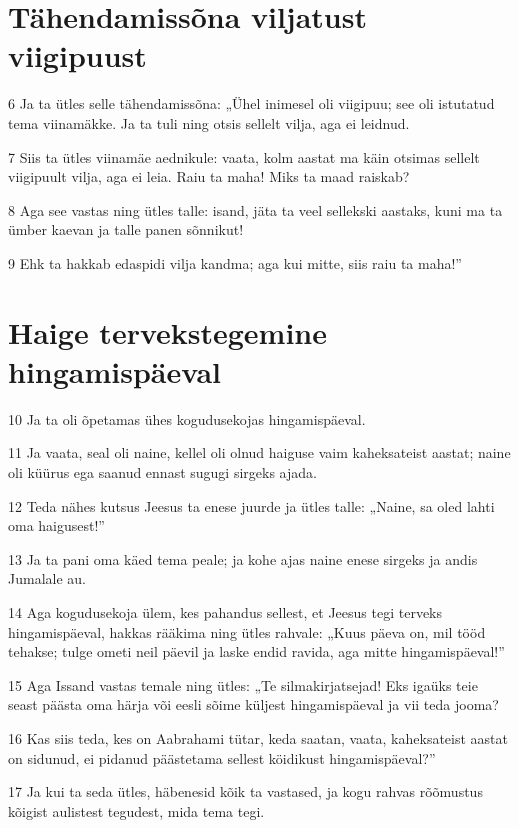 \section*{Tähendamissõna viljatust viigipuust}

\par 6 Ja ta ütles selle tähendamissõna: „Ühel inimesel oli viigipuu; see oli istutatud tema viinamäkke. Ja ta tuli ning otsis sellelt vilja, aga ei leidnud.
\par 7 Siis ta ütles viinamäe aednikule: vaata, kolm aastat ma käin otsimas sellelt viigipuult vilja, aga ei leia. Raiu ta maha! Miks ta maad raiskab?
\par 8 Aga see vastas ning ütles talle: isand, jäta ta veel sellekski aastaks, kuni ma ta ümber kaevan ja talle panen sõnnikut!
\par 9 Ehk ta hakkab edaspidi vilja kandma; aga kui mitte, siis raiu ta maha!”

\section*{Haige tervekstegemine hingamispäeval}

\par 10 Ja ta oli õpetamas ühes kogudusekojas hingamispäeval.
\par 11 Ja vaata, seal oli naine, kellel oli olnud haiguse vaim kaheksateist aastat; naine oli küürus ega saanud ennast sugugi sirgeks ajada.
\par 12 Teda nähes kutsus Jeesus ta enese juurde ja ütles talle: „Naine, sa oled lahti oma haigusest!”
\par 13 Ja ta pani oma käed tema peale; ja kohe ajas naine enese sirgeks ja andis Jumalale au.
\par 14 Aga kogudusekoja ülem, kes pahandus sellest, et Jeesus tegi terveks hingamispäeval, hakkas rääkima ning ütles rahvale: „Kuus päeva on, mil tööd tehakse; tulge ometi neil päevil ja laske endid ravida, aga mitte hingamispäeval!”
\par 15 Aga Issand vastas temale ning ütles: „Te silmakirjatsejad! Eks igaüks teie seast päästa oma härja või eesli sõime küljest hingamispäeval ja vii teda jooma?
\par 16 Kas siis teda, kes on Aabrahami tütar, keda saatan, vaata, kaheksateist aastat on sidunud, ei pidanud päästetama sellest köidikust hingamispäeval?”
\par 17 Ja kui ta seda ütles, häbenesid kõik ta vastased, ja kogu rahvas rõõmustus kõigist aulistest tegudest, mida tema tegi.

